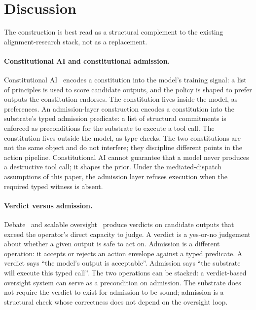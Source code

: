 \section{Discussion}
\label{sec:discussion}

The construction is best read as a structural complement to the existing alignment-research stack, not as a replacement.

\paragraph{Constitutional AI and constitutional admission.}
Constitutional AI~\cite{baiConstitutionalAI2022} encodes a constitution into the model's training signal: a list of principles is used to score candidate outputs, and the policy is shaped to prefer outputs the constitution endorses. The constitution lives inside the model, as preferences. An admission-layer construction encodes a constitution into the substrate's typed admission predicate: a list of structural commitments is enforced as preconditions for the substrate to execute a tool call. The constitution lives outside the model, as type checks. The two constitutions are not the same object and do not interfere; they discipline different points in the action pipeline. Constitutional AI cannot guarantee that a model never produces a destructive tool call; it shapes the prior. Under the mediated-dispatch assumptions of this paper, the admission layer refuses execution when the required typed witness is absent.

\paragraph{Verdict versus admission.}
Debate~\cite{christianoDebate2018} and scalable oversight~\cite{leikeScalableOversight2018,bowmanScalableOversight2022} produce verdicts on candidate outputs that exceed the operator's direct capacity to judge. A verdict is a yes-or-no judgement about whether a given output is safe to act on. Admission is a different operation: it accepts or rejects an action envelope against a typed predicate. A verdict says ``the model's output is acceptable''. Admission says ``the substrate will execute this typed call''. The two operations can be stacked: a verdict-based oversight system can serve as a precondition on admission. The substrate does not require the verdict to exist for admission to be sound; admission is a structural check whose correctness does not depend on the oversight loop.

